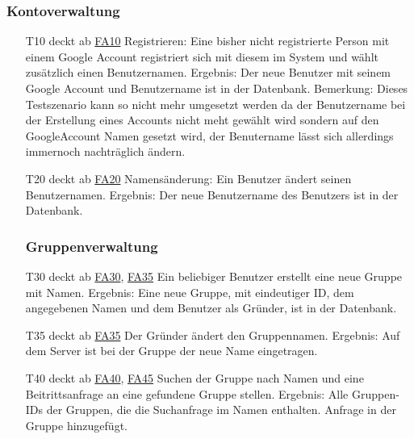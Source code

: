 \documentclass{scrartcl}
\begin{document}
\subsubsection{Kontoverwaltung}
\begin{itemize} 
	\item[T10] deckt ab \hyperlink{FA10}{FA10} \newline
	Registrieren: Eine bisher nicht registrierte Person mit einem Google Account registriert sich mit diesem im System 				und wählt zusätzlich einen Benutzernamen. \newline
	Ergebnis: Der neue Benutzer mit seinem Google Account und Benutzername ist in der Datenbank. \newline
	Bemerkung: Dieses Testszenario kann so nicht mehr umgesetzt werden da der Benutzername bei der Erstellung eines Accounts nicht meht gewählt wird sondern auf den GoogleAccount Namen gesetzt wird, der Benutername lässt sich allerdings immernoch nachträglich ändern.
	
	\item[T20] deckt ab \hyperlink{FA20}{FA20}\newline
	Namensänderung: Ein Benutzer ändert seinen Benutzernamen. \newline
	Ergebnis: Der neue Benutzername des Benutzers ist in der Datenbank. 
	
	\subsubsection{Gruppenverwaltung}
	
	\item[T30] deckt ab \hyperlink{FA30}{FA30}, \hyperlink{FA35}{FA35}\newline
	Ein beliebiger Benutzer erstellt eine neue Gruppe mit Namen. \newline
	Ergebnis: Eine neue Gruppe, mit eindeutiger ID, dem angegebenen Namen und dem Benutzer als Gründer, ist in der 			Datenbank.
	
	\item[T35] deckt ab \hyperlink{FA35}{FA35} \newline
	Der Gründer ändert den Gruppennamen.\newline
	Ergebnis: Auf dem Server ist bei der Gruppe der neue Name eingetragen. 
	
	\item[T40] deckt ab \hyperlink{FA40}{FA40}, \hyperlink{FA45}{FA45}  \newline
	Suchen der Gruppe nach Namen und eine Beitrittsanfrage an eine gefundene Gruppe stellen. \newline
	Ergebnis: Alle Gruppen-IDs der Gruppen, die die Suchanfrage im Namen enthalten. Anfrage in der Gruppe 		
	hinzugefügt.
	

\end{itemize}
\end{document}
